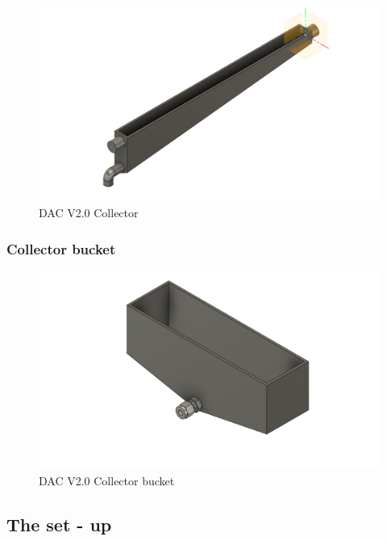 \begin{appendices}
\begin{figure}[H]
    \centering
    \includegraphics[scale = 0.4]{images/mywork/Sprint4/Collector_main.png}
    \caption{DAC V2.0 Collector}
    \label{fig:dacv2coll}
\end{figure}


\subsubsection{Collector bucket}

\begin{figure}[H]
    \centering
    \includegraphics[scale = 0.4]{images/mywork/Sprint4/DACcollbuc_new.png}
    \caption{DAC V2.0 Collector bucket}
    \label{fig:dacv2collbuc}
\end{figure}


\subsection{The set - up}


\end{appendices}
